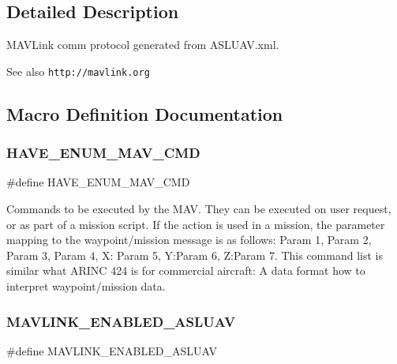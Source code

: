 \subsection{Detailed Description}
M\+A\+V\+Link comm protocol generated from A\+S\+L\+U\+A\+V.\+xml. 

\begin{DoxySeeAlso}{See also}
{\tt http\+://mavlink.\+org} 
\end{DoxySeeAlso}


\subsection{Macro Definition Documentation}
\mbox{\label{_a_s_l_u_a_v_8h_a073ec1e277b3d058a124e241c473d5ee}} 
\subsubsection{H\+A\+V\+E\+\_\+\+E\+N\+U\+M\+\_\+\+M\+A\+V\+\_\+\+C\+MD}
{\footnotesize\ttfamily \#define H\+A\+V\+E\+\_\+\+E\+N\+U\+M\+\_\+\+M\+A\+V\+\_\+\+C\+MD}



Commands to be executed by the M\+AV. They can be executed on user request, or as part of a mission script. If the action is used in a mission, the parameter mapping to the waypoint/mission message is as follows\+: Param 1, Param 2, Param 3, Param 4, X\+: Param 5, Y\+:Param 6, Z\+:Param 7. This command list is similar what A\+R\+I\+NC 424 is for commercial aircraft\+: A data format how to interpret waypoint/mission data. 

\mbox{\label{_a_s_l_u_a_v_8h_a2c53c85d9d180bc4855e89df8ab9ac87}} 
\subsubsection{M\+A\+V\+L\+I\+N\+K\+\_\+\+E\+N\+A\+B\+L\+E\+D\+\_\+\+A\+S\+L\+U\+AV}
{\footnotesize\ttfamily \#define M\+A\+V\+L\+I\+N\+K\+\_\+\+E\+N\+A\+B\+L\+E\+D\+\_\+\+A\+S\+L\+U\+AV}

